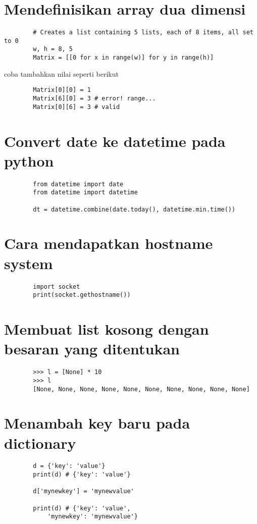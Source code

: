 \documentclass{article}
\begin{document}
	\section {Mendefinisikan array dua dimensi}
	\begin{lstlisting}
		# Creates a list containing 5 lists, each of 8 items, all set to 0
		w, h = 8, 5
		Matrix = [[0 for x in range(w)] for y in range(h)] 
	\end{lstlisting}
	coba tambahkan nilai seperti berikut
	\begin{lstlisting}
		Matrix[0][0] = 1
		Matrix[6][0] = 3 # error! range... 
		Matrix[0][6] = 3 # valid
	\end{lstlisting}

	\section {Convert date ke datetime pada python}
	\begin{lstlisting}
		from datetime import date
		from datetime import datetime
		
		dt = datetime.combine(date.today(), datetime.min.time())
	\end{lstlisting}

	\section {Cara mendapatkan hostname system}
	\begin{lstlisting}
		import socket
		print(socket.gethostname())
	\end{lstlisting}

	\section {Membuat list kosong dengan besaran yang ditentukan}
	\begin{lstlisting}
		>>> l = [None] * 10
		>>> l
		[None, None, None, None, None, None, None, None, None, None]
	\end{lstlisting}

	\section{Menambah key baru pada dictionary}
	\begin{lstlisting}
		d = {'key': 'value'}
		print(d) # {'key': 'value'}
		
		d['mynewkey'] = 'mynewvalue'
		
		print(d) # {'key': 'value',
			'mynewkey': 'mynewvalue'}
	\end{lstlisting}
\end{document}
